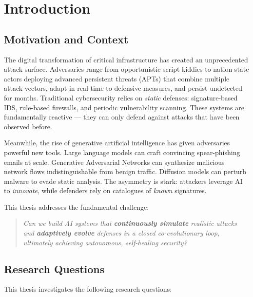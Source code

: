 \chapter{Introduction}
\label{ch:introduction}

\section{Motivation and Context}

The digital transformation of critical infrastructure has created an
unprecedented attack surface. Adversaries range from opportunistic
script-kiddies to nation-state actors deploying advanced persistent threats
(APTs) that combine multiple attack vectors, adapt in real-time to defensive
measures, and persist undetected for months.
Traditional cybersecurity relies on \emph{static} defenses:
signature-based IDS, rule-based firewalls, and periodic vulnerability scanning.
These systems are fundamentally reactive — they can only defend against
attacks that have been observed before.

Meanwhile, the rise of generative artificial intelligence has given
adversaries powerful new tools.
Large language models can craft convincing spear-phishing emails at scale.
Generative Adversarial Networks can synthesize malicious network flows
indistinguishable from benign traffic.
Diffusion models can perturb malware to evade static analysis.
The asymmetry is stark: attackers leverage AI to \emph{innovate},
while defenders rely on catalogues of \emph{known} signatures.

This thesis addresses the fundamental challenge:
\begin{quote}
\textit{Can we build AI systems that \textbf{continuously simulate}
realistic attacks and \textbf{adaptively evolve} defenses in a closed
co-evolutionary loop, ultimately achieving autonomous, self-healing security?}
\end{quote}

\section{Research Questions}

This thesis investigates the following research questions:

